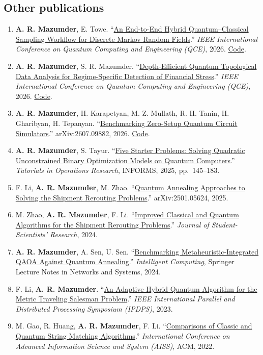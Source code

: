 \documentclass[letterpaper,10pt]{article}
\begin{document}
\subsection*{Other publications}
\begin{enumerate}
  \item \textbf{A. R. Mazumder}, E. Towe. ``\href{https://arxiv.org/abs/2607.09893}{An End-to-End
  Hybrid Quantum--Classical Sampling Workflow for Discrete Markov Random Fields}.'' \textit{IEEE International Conference on Quantum Computing and Engineering (QCE)}, 2026. \href{https://github.com/arulrhikm/QuantumDGM}{Code}.
  \item \textbf{A. R. Mazumder}, S. R. Mazumder. ``\href{https://arxiv.org/abs/2607.09906}{Depth-Efficient
  Quantum Topological Data Analysis for Regime-Specific Detection of Financial Stress}.'' \textit{IEEE International Conference on Quantum Computing and Engineering (QCE)}, 2026. \href{https://github.com/arulrhikm/Quantum-Market-Crash-TDA}{Code}.
  \item \textbf{A. R. Mazumder}, H. Karapetyan, M. Z. Mullath, R. H. Tanin, H. Gharibyan, H. Tepanyan.
  ``\href{https://arxiv.org/abs/2607.09882}{Benchmarking Zero-Setup Quantum Circuit Simulators}.'' arXiv:2607.09882, 2026. \href{https://github.com/arulrhikm/mps-pps-zero-setup-benchmarks}{Code}.
  \item \textbf{A. R. Mazumder}, S. Tayur. ``\href{https://pubsonline.informs.org/doi/abs/10.1287/educ.2025.0288}{Five Starter Problems: Solving
  Quadratic Unconstrained Binary Optimization Models on Quantum Computers}.'' \textit{Tutorials in Operations
  Research}, INFORMS, 2025, pp.~145--183.
  \item F. Li, \textbf{A. R. Mazumder}, M. Zhao. ``\href{https://arxiv.org/pdf/2501.05624}{Quantum Annealing Approaches
  to Solving the Shipment Rerouting Problems}.'' arXiv:2501.05624, 2025.
  \item M. Zhao, \textbf{A. R. Mazumder}, F. Li. ``\href{https://doi.org/10.13021/jssr2024.4263}{Improved Classical and
  Quantum Algorithms for the Shipment Rerouting Problems}.'' \textit{Journal of Student-Scientists' Research}, 2024.
  \item \textbf{A. R. Mazumder}, A. Sen, U. Sen. ``\href{https://arxiv.org/pdf/2309.16796v3}{Benchmarking
  Metaheuristic-Integrated QAOA Against Quantum Annealing}.'' \textit{Intelligent Computing}, Springer Lecture Notes in Networks and Systems, 2024.
  \item F. Li, \textbf{A. R. Mazumder}. ``\href{https://ieeexplore.ieee.org/abstract/document/10177447}{An Adaptive Hybrid
  Quantum Algorithm for the Metric Traveling Salesman Problem}.'' \textit{IEEE International Parallel and Distributed Processing Symposium (IPDPS)}, 2023.
  \item M. Gao, R. Huang, \textbf{A. R. Mazumder}, F. Li. ``\href{https://dl.acm.org/doi/pdf/10.1145/3573834.3574498}{Comparisons
  of Classic and Quantum String Matching Algorithms}.'' \textit{International Conference on Advanced Information Science and System (AISS)}, ACM, 2022.
\end{enumerate}
\normalsize
\end{document}
